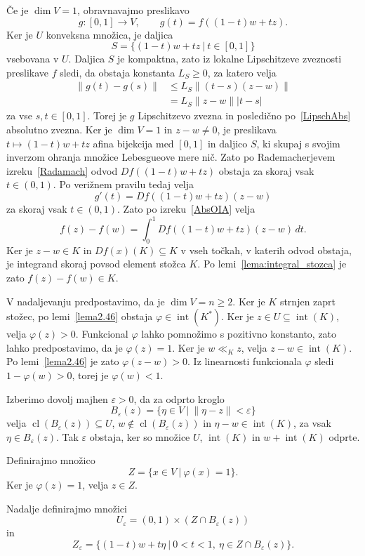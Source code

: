 \documentclass[mat2, tisk]{fmfdelo}
\begin{document}
\begin{dokaz}
Če je $\dim V=1$, obravnavajmo preslikavo
\[
g:[0,1]\to V,\qquad
g(t)=f((1-t)w+tz).
\]
Ker je $U$ konveksna množica, je daljica
\[
S=\{(1-t)w+tz ~|~ t\in[0,1]\}
\]
vsebovana v $U$.
Daljica $S$ je kompaktna, zato iz lokalne
Lipschitzeve zveznosti preslikave $f$
sledi, da obstaja konstanta $L_S\geq0$,
za katero velja
\[
\begin{aligned}
\|g(t)-g(s)\|
&\leq L_S\|(t-s)(z-w)\|\\
&=L_S\|z-w\||t-s|
\end{aligned}
\]
za vse $s,t\in[0,1]$.
Torej je $g$ Lipschitzevo zvezna
in posledično po~\ref{LipschAbs} absolutno zvezna. Ker je $\dim V=1$ in $z-w\neq0$, je preslikava
$t\mapsto(1-t)w+tz$ afina bijekcija med
$[0,1]$ in daljico $S$, ki skupaj s svojim
inverzom ohranja množice Lebesgueove mere nič.
Zato po Rademacherjevem izreku~\ref{Radamach}
odvod $Df((1-t)w+tz)$ obstaja za skoraj vsak
$t\in(0,1)$.
Po verižnem pravilu tedaj velja
\[
g'(t)=Df((1-t)w+tz)(z-w)
\]
za skoraj vsak $t\in(0,1)$. Zato po izreku~\ref{AbsOIA} velja
\[
f(z)-f(w)
=
\int_0^1
Df((1-t)w+tz)(z-w)\,dt.
\]
Ker je $z-w\in K$ in $Df(x)(K)\subseteq K$
v vseh točkah, v katerih odvod obstaja,
je integrand skoraj povsod element stožca
$K$. Po lemi~\ref{lema:integral_stozca} je zato
$f(z)-f(w)\in K$.

V nadaljevanju predpostavimo, da je
$\dim V=n\geq 2$.
Ker je $K$ strnjen zaprt stožec, po
lemi~\ref{lema2.46} obstaja
$\varphi\in\operatorname{int}(K^*)$.
Ker je $z\in U\subseteq\operatorname{int}(K)$,
velja $\varphi(z)>0$.
Funkcional $\varphi$ lahko pomnožimo s
pozitivno konstanto, zato lahko
predpostavimo, da je $\varphi(z)=1$.
Ker je $w\ll_K z$, velja
$z-w\in\operatorname{int}(K)$.
Po lemi~\ref{lema2.46} je zato
$\varphi(z-w)>0$.
Iz linearnosti funkcionala $\varphi$ sledi
$1-\varphi(w)>0$,
torej je $\varphi(w)<1$.

Izberimo dovolj majhen $\varepsilon>0$,
da za odprto kroglo
\[
B_\varepsilon(z)
=
\{\eta\in V ~|~ \|\eta-z\|<\varepsilon\}
\]
velja
$\operatorname{cl}(B_\varepsilon(z))\subseteq U$, 
$w\notin\operatorname{cl}(B_\varepsilon(z))$
in
$\eta-w\in\operatorname{int}(K)$, 
za vsak $\eta\in B_\varepsilon(z)$.
Tak $\varepsilon$ obstaja, ker so množice
$U$, $\operatorname{int}(K)$ in
$w+\operatorname{int}(K)$ odprte.

Definirajmo množico
\[
Z=\{x\in V ~|~ \varphi(x)=1\}.
\]
Ker je $\varphi(z)=1$, velja $z\in Z$.

Nadalje definirajmo množici
\[
U_\varepsilon
=
(0,1)\times(Z\cap B_\varepsilon(z))
\]
in
\[
Z_\varepsilon
=
\{(1-t)w+t\eta ~|~ 
0<t<1,\ \eta\in Z\cap B_\varepsilon(z)\}.
\]


\end{dokaz}
\end{document}
